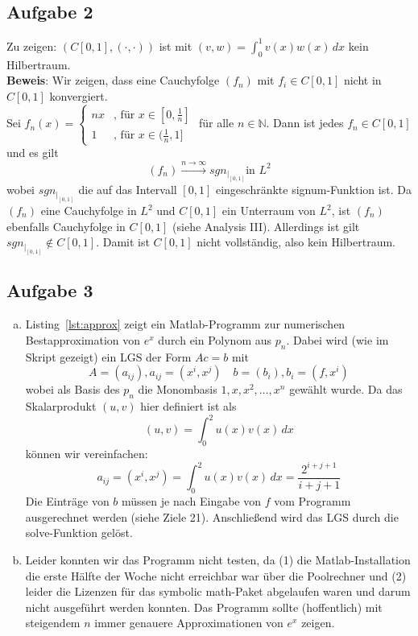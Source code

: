 \documentclass[11pt,a4paper,ngerman]{article}
\begin{document}
\subsection*{Aufgabe 2}
Zu zeigen: $(C[0,1],(\cdot,\cdot))$ ist mit $(v,w) = \int_0^1 v(x)w(x)\,dx$ kein Hilbertraum. \\
\textbf{Beweis}: Wir zeigen, dass eine Cauchyfolge $\left( f_n \right)$ mit $f_i \in C[0,1]$
                 nicht in $C[0,1]$ konvergiert. \\

  Sei $f_n (x) = \begin{cases}
                nx & \text{, für $x \in [0,\frac{1}{n}]$} \\
                1 & \text{, für $x \in (\frac{1}{n},1]$}
             \end{cases}$ für alle $n \in \mathbb{N}$. Dann ist jedes $f_n \in C[0,1]$ und es gilt
  \begin{equation*}
    \left( f_n \right) \stackrel{n \to \infty}{\longrightarrow} sgn_{{\left. \right|}_{[0,1]}} \text{in $L^2$}
  \end{equation*}
  wobei $sgn_{{\left. \right|}_{[0,1]}}$ die auf das Intervall $[0,1]$ eingeschränkte signum-Funktion ist.
  Da $\left(f_n\right)$ eine Cauchyfolge in $L^2$ und $C[0,1]$ ein Unterraum von $L^2$,
  ist $\left(f_n\right)$ ebenfalls Cauchyfolge in $C[0,1]$ (siehe Analysis III).
  Allerdings ist gilt $ sgn_{{\left. \right|}_{[0,1]}} \notin C[0,1]$.
  Damit ist $C[0,1]$ nicht vollständig, also kein Hilbertraum.
  
\subsection*{Aufgabe 3}
\begin{enumerate}[a)]
\item Listing~\ref{lst:approx} zeigt ein Matlab-Programm zur numerischen Bestapproximation von $e^x$ durch ein Polynom aus $p_n$. Dabei wird (wie im Skript gezeigt) ein LGS der Form $Ac = b$ mit
$$ A = (a_{ij}), a_{ij} = (x^i,x^j) \quad b = (b_i), b_i = (f,x^i) $$
wobei als Basis des $p_n$ die Monombasis ${1,x,x^2,\ldots,x^n}$ gewählt wurde.
Da das Skalarprodukt $(u,v)$ hier definiert ist als 
$$ (u,v) = \int_0^2 u(x)v(x)\,dx $$
können wir vereinfachen:
$$ a_{ij} = (x^i,x^j) = \int_0^2 u(x)v(x)\,dx = \frac{2^{i+j+1}}{i+j+1} $$
Die Einträge von $b$ müssen je nach Eingabe von $f$ vom Programm ausgerechnet werden (siehe Ziele 21).
Anschließend wird das LGS durch die solve-Funktion gelöst.



\item Leider konnten wir das Programm nicht testen, da (1) die Matlab-Installation die erste Hälfte der Woche nicht erreichbar war über die Poolrechner und (2) leider die Lizenzen für das symbolic math-Paket abgelaufen waren und darum nicht ausgeführt werden konnten.
Das Programm sollte (hoffentlich) mit steigendem $n$ immer genauere Approximationen von $e^x$ zeigen.\\
\end{enumerate}
\label{LastPage}
\end{document}
